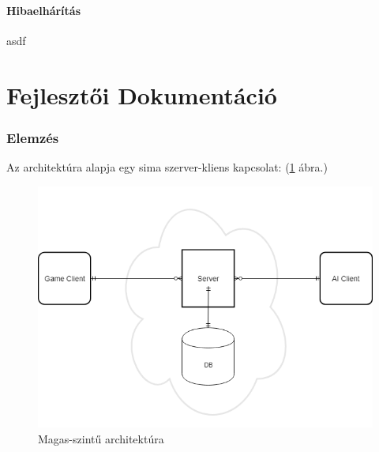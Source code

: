 \documentclass[twoside, a4paper, 12pt]{article}
\begin{document}
\subsection{Hibaelhárítás}
asdf









































\newpage
\part{Fejlesztői Dokumentáció}
\section{Elemzés}

Az architektúra alapja egy sima szerver-kliens kapcsolat: (\ref{fig:highLevelArchitecture} ábra.)

\begin{figure}[htbp]
	\centering
	\includegraphics[width=1.0\textwidth]{img/highLevelArchitecture.png}
	\caption{Magas-szintű architektúra}
	\label{fig:highLevelArchitecture}
\end{figure}
\end{document}
